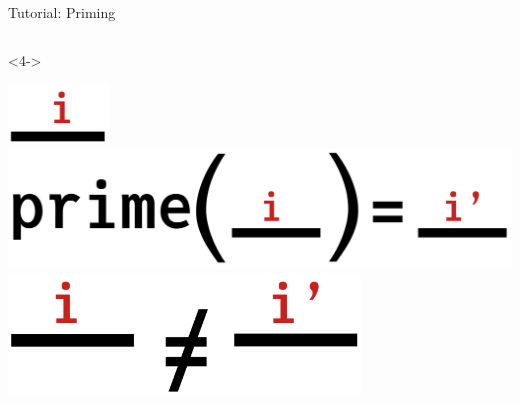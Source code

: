 \begin{frame}[fragile]{Tutorial: Priming}
\begin{columns}
\begin{column}{4.5cm}
\begin{onlyenv}<4->
\begin{center}
\includegraphics[width=0.2\textwidth]{
  slides/assets/i.png
} \\
\vspace*{0.5cm}
\includegraphics[width=1.0\textwidth]{
  slides/assets/prime_i.png
} \\
\includegraphics[width=0.7\textwidth]{
  slides/assets/i_neq_ip.png
}
\end{center}
\end{onlyenv}

\end{column}

\end{columns}

\end{frame}
